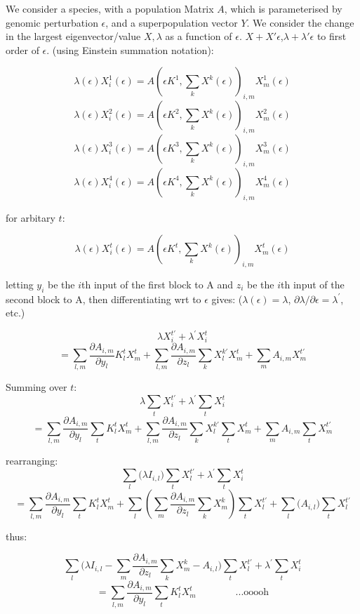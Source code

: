 \documentclass{article}
\begin{document}

We consider a species, with a population Matrix $A$, which is parameterised by genomic perturbation $\epsilon$, and a superpopulation vector $Y$. We consider the change in the largest eigenvector/value $X,\lambda$ as a function of $\epsilon$.
$X+X'\epsilon$,$\lambda+\lambda'\epsilon$ to first order of $\epsilon$. (using Einstein summation notation):

$$ \lambda(\epsilon)X_{i}^1(\epsilon) = A(\epsilon K^1,\sum_kX^k(\epsilon))_{i,m}X_{m}^1(\epsilon) $$
$$ \lambda(\epsilon)X_{i}^2(\epsilon) = A(\epsilon K^2,\sum_kX^k(\epsilon))_{i,m}X_{m}^2(\epsilon) $$
$$ \lambda(\epsilon)X_{i}^3(\epsilon) = A(\epsilon K^3,\sum_kX^k(\epsilon))_{i,m}X_{m}^3(\epsilon) $$
$$ \lambda(\epsilon)X_{i}^4(\epsilon) = A(\epsilon K^4,\sum_kX^k(\epsilon))_{i,m}X_{m}^4(\epsilon) $$

for arbitary $t$:

$$ \lambda(\epsilon)X_{i}^t(\epsilon) = A(\epsilon K^t,\sum_kX^k(\epsilon))_{i,m}X_{m}^t(\epsilon) $$

letting $y_i$ be the $i$th input of the first block to A and $z_i$ be the $i$th input of the second block to A, then differentiating wrt to $\epsilon$ gives: ($\lambda(\epsilon) = \lambda$, $\partial\lambda/\partial\epsilon = \lambda^\prime$, etc.)

$$ \lambda X_i^{t\prime} + \lambda^\prime X_i^t $$
$$ = \sum_{l,m} \frac{\partial A_{i,m}}{\partial y_l}K^t_lX_m^t + \sum_{l,m}\frac{\partial A_{i,m}}{\partial z_l} \sum_kX^{k\prime}_lX_m^t + \sum_mA_{i,m}X_m^{t\prime}$$

Summing over $t$:
$$ \lambda \sum_t X_i^{t\prime} + \lambda^\prime \sum_t X_i^t $$
$$ = \sum_{l,m} \frac{\partial A_{i,m}}{\partial y_l}\sum_t K^t_lX_m^t + \sum_{l,m}\frac{\partial A_{i,m}}{\partial z_l} \sum_kX^{k\prime}_l\sum_t X_m^t + \sum_mA_{i,m}\sum_t X_m^{t\prime}$$

rearranging:
$$ \sum_l\Bigg(\lambda I_{i,l}\Bigg) \sum_t X_l^{t\prime} + \lambda^\prime \sum_t X_i^t$$
$$ = \sum_{l,m} \frac{\partial A_{i,m}}{\partial y_l}\sum_t K^t_lX_m^t + \sum_l\left(\sum_{m}\frac{\partial A_{i,m}}{\partial z_l}\sum_k X_m^k\right) \sum_tX^{t\prime}_l + \sum_l\Bigg(A_{i,l}\Bigg)\sum_t X_l^{t\prime}$$

thus:

$$ \sum_l\Bigg(\lambda I_{i,l} - \sum_{m}\frac{\partial A_{i,m}}{\partial z_l}\sum_k X_m^k - A_{i,l} \Bigg) \sum_t X_l^{t\prime} + \lambda^\prime \sum_t X_i^t$$
$$ = \sum_{l,m} \frac{\partial A_{i,m}}{\partial y_l}\sum_t K^t_lX_m^t \qquad\qquad\text{...ooooh}$$
\end{document}
